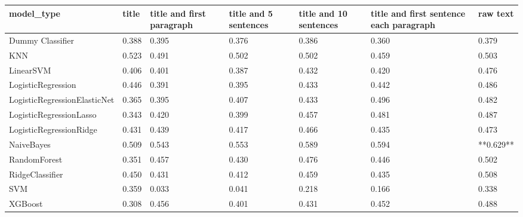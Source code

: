 \begin{tabular}{lllllll}
\toprule
                  model\_type & title & title and first paragraph & title and 5 sentences & title and 10 sentences & title and first sentence each paragraph &  raw text \\
\midrule
            Dummy Classifier & 0.388 &                     0.395 &                 0.376 &                  0.386 &                                   0.360 &     0.379 \\
                         KNN & 0.523 &                     0.491 &                 0.502 &                  0.502 &                                   0.459 &     0.503 \\
                   LinearSVM & 0.406 &                     0.401 &                 0.387 &                  0.432 &                                   0.420 &     0.476 \\
          LogisticRegression & 0.446 &                     0.391 &                 0.395 &                  0.433 &                                   0.442 &     0.486 \\
LogisticRegressionElasticNet & 0.365 &                     0.395 &                 0.407 &                  0.433 &                                   0.496 &     0.482 \\
     LogisticRegressionLasso & 0.343 &                     0.420 &                 0.399 &                  0.457 &                                   0.481 &     0.487 \\
     LogisticRegressionRidge & 0.431 &                     0.439 &                 0.417 &                  0.466 &                                   0.435 &     0.473 \\
                  NaiveBayes & 0.509 &                     0.543 &                 0.553 &                  0.589 &                                   0.594 & **0.629** \\
                RandomForest & 0.351 &                     0.457 &                 0.430 &                  0.476 &                                   0.446 &     0.502 \\
             RidgeClassifier & 0.450 &                     0.431 &                 0.412 &                  0.459 &                                   0.435 &     0.508 \\
                         SVM & 0.359 &                     0.033 &                 0.041 &                  0.218 &                                   0.166 &     0.338 \\
                     XGBoost & 0.308 &                     0.456 &                 0.401 &                  0.431 &                                   0.452 &     0.488 \\
\bottomrule
\end{tabular}
